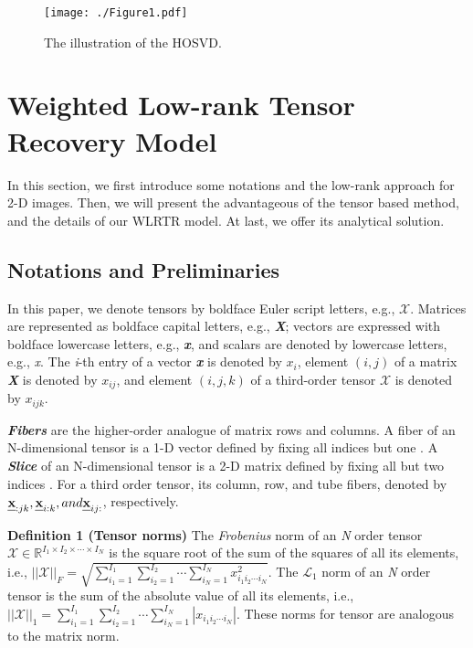 \documentclass[twocolumn]{svjour3}          %
\begin{document}
\begin{figure}
    \texttt{[image: ./Figure1.pdf]}
   \caption{The illustration of the HOSVD.}
\label{Degradation including HOSVD}
\end{figure}


\section{Weighted Low-rank Tensor Recovery Model}
\label{sec:classifiers}

    In this section, we first introduce some notations and the low-rank approach for 2-D images. Then, we will present the advantageous of the tensor based method, and the details of our WLRTR model. At last, we offer its analytical solution.

   \subsection{Notations and Preliminaries }
     In this paper, we denote tensors by boldface Euler script letters, e.g., $\boldsymbol{\mathcal{X}}$. Matrices are represented as boldface capital letters, e.g., \textbf{\emph{X}}; vectors are expressed with boldface lowercase letters, e.g., \emph{\textbf{x}}, and scalars are denoted by lowercase letters, e.g., \emph{x}. The \emph{i}-th entry of a vector \textbf{\emph{x}} is denoted by ${x_i}$, element $(i,j)$ of a matrix \textbf{\emph{X}} is denoted by ${x_{ij}}$, and element $(i,j,k)$ of a third-order tensor $\boldsymbol{\mathcal{X}}$ is denoted by ${x_{ijk}}$.

    \emph{\textbf{Fibers}} are the higher-order analogue of matrix rows and columns. A fiber of an N-dimensional tensor is a 1-D vector defined by fixing all indices but one \cite{Kolda2005Tensor}. A \emph{\textbf{Slice}} of an N-dimensional tensor is a 2-D matrix defined by fixing all but two indices \cite{Kolda2005Tensor}. For a third order tensor, its column, row, and tube fibers, denoted by ${\textbf{\emph{x}}_{:jk}},{\textbf{\emph{x}}_{i:k}}, and {\textbf{\emph{x}}_{ij:}}$, respectively.

    \noindent
    \textbf{Definition 1 (Tensor norms)} The \emph{Frobenius} norm of an \emph{N} order tensor ${\boldsymbol{\mathcal{X}}} \in {\mathbb{R}^{{I_1} \times {I_2} \times  \cdots  \times {I_N}}}$ is the square root of the sum of the squares of all its elements, i.e., $||\boldsymbol{\mathcal{X}}|{|_F} = \sqrt {\sum\nolimits_{{i_1} = 1}^{{I_1}} {\sum\nolimits_{{i_2} = 1}^{{I_2}} { \cdots \sum\nolimits_{{i_N} = 1}^{{I_N}} {x_{{i_1}{i_2} \cdots {i_N}}^2} } } }$. The ${\mathcal{L}_1}$ norm of an \emph{N} order tensor is the sum of the absolute value of all its elements, i.e., $||\boldsymbol{\mathcal{X}}|{|_1} = \sum\nolimits_{{i_1} = 1}^{{I_1}} {\sum\nolimits_{{i_2} = 1}^{{I_2}} { \cdots \sum\nolimits_{{i_N} = 1}^{{I_N}} {|{x_{{i_1}{i_2} \cdots {i_N}}}|} } }$. These norms for tensor are analogous to the matrix norm.
\end{document}
